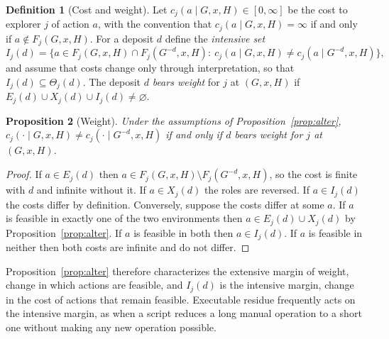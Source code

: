 \documentclass[11pt]{article}
\newtheorem{proposition}{Proposition}[section]
\theoremstyle{definition}
\newtheorem{definition}[proposition]{Definition}
\theoremstyle{remark}
\begin{document}
\begin{definition}[Cost and weight]\label{def:cost}
Let $c_j(a\mid G,x,H)\in[0,\infty]$ be the cost to explorer $j$ of action $a$, with the convention that $c_j(a\mid G,x,H)=\infty$ if and only if $a\notin F_j(G,x,H)$. For a deposit $d$ define the \emph{intensive set}
$$I_j(d)=\bigl\{a\in F_j(G,x,H)\cap F_j(G^{-d},x,H):\ c_j(a\mid G,x,H)\neq c_j(a\mid G^{-d},x,H)\bigr\},$$
and assume that costs change only through interpretation, so that $I_j(d)\subseteq\Theta_j(d)$. The deposit $d$ \emph{bears weight} for $j$ at $(G,x,H)$ if $E_j(d)\cup X_j(d)\cup I_j(d)\neq\varnothing$.
\end{definition}

\begin{proposition}[Weight]\label{prop:weight}
Under the assumptions of Proposition~\ref{prop:alter}, $c_j(\cdot\mid G,x,H)\neq c_j(\cdot\mid G^{-d},x,H)$ if and only if $d$ bears weight for $j$ at $(G,x,H)$.
\end{proposition}
\begin{proof}
If $a\in E_j(d)$ then $a\in F_j(G,x,H)\setminus F_j(G^{-d},x,H)$, so the cost is finite with $d$ and infinite without it. If $a\in X_j(d)$ the roles are reversed. If $a\in I_j(d)$ the costs differ by definition. Conversely, suppose the costs differ at some $a$. If $a$ is feasible in exactly one of the two environments then $a\in E_j(d)\cup X_j(d)$ by Proposition~\ref{prop:alter}. If $a$ is feasible in both then $a\in I_j(d)$. If $a$ is feasible in neither then both costs are infinite and do not differ.
\end{proof}

Proposition~\ref{prop:alter} therefore characterizes the extensive margin of weight, change in which actions are feasible, and $I_j(d)$ is the intensive margin, change in the cost of actions that remain feasible. Executable residue frequently acts on the intensive margin, as when a script reduces a long manual operation to a short one without making any new operation possible.
\end{document}
